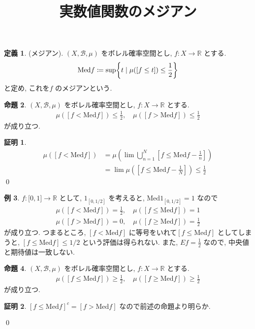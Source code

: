 \documentclass[10pt, fleqn, label-section=none]{bxjsarticle}
\title{実数値関数のメジアン }
\date{}
\author{}
\theoremstyle{definition}
\newtheorem{dfn}{定義}[section]
\newtheorem{ex}[dfn]{例}
\newtheorem{prop}[dfn]{命題}
\newtheorem*{pf*}{証明}
\newcommand{\cbra}[1]{\mleft\{#1\mright\}}
\newcommand{\Med}{\textrm{Med}}
\renewcommand{\;}{\, ; \,}
\begin{document}
\maketitle




\section{}
\subsection{}


\begin{dfn}(メジアン). $(X, \mathcal B, \mu)$ をボレル確率空間とし, $f: X \rightarrow \mathbb R$ とする. 
\begin{align*} \Med f \coloneqq \sup \cbra{t \mid \mu([f \leq t]) \leq \frac{1}{2}  }\end{align*}
と定め, これを$f$ のメジアンという. 
\end{dfn}

\begin{prop}$(X, \mathcal B, \mu)$ をボレル確率空間とし, $f: X \rightarrow \mathbb R$ とする. 
\begin{align*} \mu([f < \Med f]) \leq \frac{1}{2} , \quad \mu([f > \Med f]) \leq \frac{1}{2}  \end{align*}
が成り立つ. 
\end{prop}
\begin{pf*}
\begin{align*} \mu([f < \Med f]) &= \mu ( \lim \bigcup_{n = 1} ^N [f \leq \Med f - \frac{1}{n}]) \\& = \lim \mu ( [f \leq \Med f - \frac{1}{N}] ) \leq \frac{1}{2} \end{align*}
\qed
\end{pf*}


\begin{ex}$f: \mathbb [0, 1] \rightarrow \mathbb R$ として, $1_{[0, 1/2]}$ を考えると, $\Med 1_{[0, 1/2]} = 1$ なので
\begin{align*}  \mu([f < \Med f]) = \frac{1}{2}, \quad  \mu([f \leq  \Med f])  = 1 \\   \mu([f > \Med f]) = 0 , \quad  \mu([f \geq  \Med f])  = \frac{1}{2}  \end{align*}
が成り立つ.  つまるところ, $[f < \Med f]$ に等号をいれて$[f \leq \Med f]$ としてしまうと, $[f \leq \Med f]  \leq 1/2$ という評価は得られない.  また, $Ef = \frac{1}{2}$ なので, 中央値と期待値は一致しない. 
\end{ex}

\begin{prop}$(X, \mathcal B, \mu)$ をボレル確率空間とし, $f: X \rightarrow \mathbb R$ とする. 
\begin{align*} \mu([f \leq  \Med f]) \geq \frac{1}{2} , \quad \mu([f \geq \Med f]) \geq \frac{1}{2}  \end{align*}
が成り立つ. 

\end{prop}
\begin{pf*}$[f \leq  \Med f]^ c = [f >  \Med f] $ なので前述の命題より明らか. 

\qed
\end{pf*}
\end{document}
